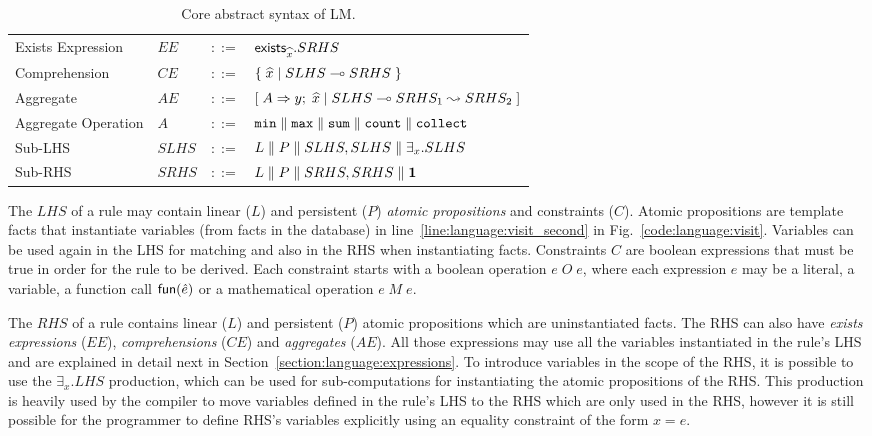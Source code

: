 \begin{table}[h]
\begin{tabular}{ l l c l }
  
  Exists Expression & $EE$ & $::=$ & $\mathsf{exists}_{\widehat{x}}. SRHS$ \\
  Comprehension & $CE$ & $::=$ & $\{ \; \widehat{x} \; | \; SLHS \multimap SRHS \; \}$ \\

  Aggregate & $AE$ & $::=$ & $[\; A \Rightarrow y; \; \widehat{x} \; | \; SLHS \multimap SRHS_1 \leadsto SRHS_2 \;]$ \\
  Aggregate Operation & $A$ & $::=$ & $\mathtt{min} \; \Vert \; \mathtt{max} \; \Vert \;
\mathtt{sum} \; \Vert \; \mathtt{count} \; \Vert \; \mathtt{collect}$ \\
  
  Sub-LHS & $SLHS$ & $::=$ & $L \; \Vert \; P \; \Vert \; SLHS, SLHS \; \Vert \; \exists_{x}. SLHS$\\
  Sub-RHS & $SRHS$ & $::=$ & $L \; \Vert \; P \; \Vert \; SRHS, SRHS \; \Vert \; \mathbf{1}$\\
  
\end{tabular}
\caption{Core abstract syntax of LM.}\label{tbl:language:ast}
\end{table}

The $LHS$ of a rule may contain linear ($L$) and persistent ($P$) \emph{atomic
propositions} and constraints ($C$). Atomic propositions are template facts that
instantiate variables (from facts in the database) in
line~\ref{line:language:visit_second} in Fig.~\ref{code:language:visit}.
Variables can be used again in the LHS for matching and also in the RHS when
instantiating facts.  Constraints $C$ are boolean expressions that must be true
in order for the rule to be derived. Each constraint starts with a boolean
operation $e \; O \; e$, where each expression $e$ may be a literal, a variable,
a function call $\mathsf{fun}(\hat{e})$ or a mathematical operation $e \; M \; e$.

The $RHS$ of a rule contains linear ($L$) and persistent ($P$) atomic
propositions which are uninstantiated facts. The RHS can also have \emph{exists
expressions} ($EE$), \emph{comprehensions} ($CE$) and \emph{aggregates} ($AE$).
All those expressions may use all the variables instantiated in the rule's LHS
and are explained in detail next in Section~\ref{section:language:expressions}.
To introduce variables in the scope of the RHS, it is possible to use the
$\exists_x. LHS$ production, which can be used for sub-computations for
instantiating the atomic propositions of the RHS. This production is heavily
used by the compiler to move variables defined in the rule's LHS to the RHS
which are only used in the RHS, however it is still possible for the programmer
to define RHS's variables explicitly using an equality constraint of the form $x
= e$.

